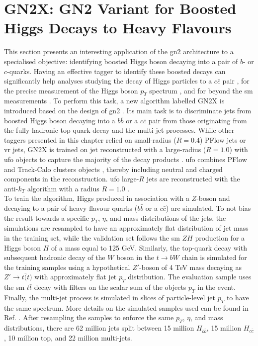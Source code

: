 
\newpage
\section{GN2X: GN2 Variant for Boosted Higgs Decays to Heavy Flavours}\label{app-chap-GN2X}
This section presents an interesting application of the \gls{gn2} architecture to a specialised objective: identifying boosted Higgs boson decaying into a pair of $b$- or $c$-quarks. Having an effective tagger to identify these boosted decays can significantly help analyses studying the decay of Higgs particles to a $c\bar{c}$ pair \cite{ATLAS:2022ers}, for the precise measurement of the Higgs boson $p_T$ spectrum \cite{PhysRevD.105.092003}, and for beyond the \gls{sm} measurements \cite{ATLAS:2023azi}. To perform this task, a new algorithm labelled GN2X is introduced based on the design of \gls{gn2} \cite{ATL-PHYS-PUB-2023-021}. Its main task is to discriminate jets from boosted Higgs boson decaying into a $b\bar{b}$ or a $c\bar{c}$ pair from those originating from the fully-hadronic top-quark decay and the multi-jet processes. While other taggers presented in this chapter relied on small-radius ($R=0.4$) PFlow jets or \gls{vr} jets, GN2X is trained on jet reconstructed with a large-radius ($R=1.0$) with \gls{ufo} objects to capture the majority of the decay products \cite{atlasLARGERJet}. \gls{ufo} combines PFlow \cite{atlasPFLOW} and Track-Calo clusters objects \cite{ATL-PHYS-PUB-2017-015}, thereby including neutral and charged components in the reconstruction. \gls{ufo} large-$R$ jets are reconstructed with the anti-$k_T$ algorithm with a radius $R = 1.0$ \cite{Cacciari:2008gp}. \\

To train the algorithm, Higgs produced in association with a $Z$-boson and decaying to a pair of heavy flavour quarks ($b\bar{b}$ or a $c\bar{c}$) are simulated. To not bias the result towards a specific $p_T$, $\eta$, and mass distributions of the jets, the simulations are resampled to have an approximately flat distribution of jet mass in the training set, while the validation set follows the \gls{sm} $ZH$ production for a Higgs boson $H$ of a mass equal to 125 GeV. Similarly, the top-quark decay with subsequent hadronic decay of the $W$ boson in the $t \rightarrow bW$ chain is simulated for the training samples using a hypothetical $Z'$-boson of 4 TeV mass decaying as $Z' \rightarrow t\bar(t)$ with approximately flat jet $p_T$ distribution. The evaluation sample uses the \gls{sm} $t\bar{t}$ decay with filters on the scalar sum of the objects $p_T$ in the event. Finally, the multi-jet process is simulated in slices of particle-level jet $p_T$ to have the same spectrum. More details on the simulated samples used can be found in Ref. \cite{ATL-PHYS-PUB-2023-021}. After resampling the samples to enforce the same $p_T$, $\eta$, and mass distributions, there are 62 million jets split between 15 million $H_{b\bar{b}}$, 15 million $H_{c\bar{c}}$, 10 million top, and 22 million multi-jets. \\

